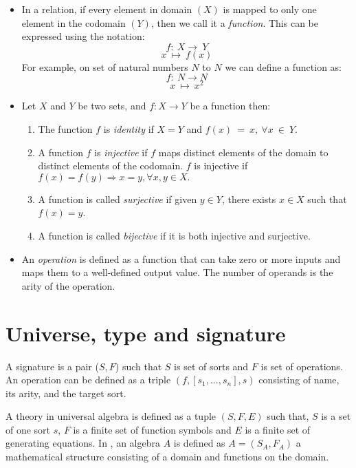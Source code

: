 \begin{itemize}
\item In a relation, if every element in domain $(X)$ is mapped to only one element in
the codomain $(Y)$, then we call it a \emph{function}. This can be expressed using the notation:
\[f:\ X \rightarrow\ Y\]
\[x \ \mapsto\ f(x)\]
For example, on set of natural numbers $N$ to $N$ we can define a function as:
\[f:\ N \rightarrow N\]
\[x \ \mapsto\ x^{2}\]   
\item Let $ X $ and $ Y $ be two sets, and $ f:X \rightarrow Y$ be a function then:
\begin{enumerate}
    \item The function $f$ is \textit{identity} if $X=Y$ and $f(x)\ =\ x,\
    \forall x\ \in \ Y$.
    \item A function $f$ is \emph{injective} if $f$ maps distinct elements of
    the domain to distinct elements of the codomain. $f$ is injective if
    $f(x)=f(y) \Rightarrow x = y, \forall x,y \in X.$
    \item A function is called \emph{surjective} if given $y \in Y$, there
    exists $x\in X$ such that $f(x) = y$.
    \item A function is called \emph{bijective} if it is both injective and
    surjective.
\end{enumerate}
\item An \emph{operation} is defined as a function that can take zero or more inputs
and maps them to a well-defined output value. The number of operands is the arity
of the operation.
\end{itemize}

\section{Universe, type and signature}
A signature is a pair ($S,F$) such that $S$ is set of sorts and $F$ is set of
operations. An operation can be defined as a triple $(f,[s_1,...,s_n],s)$
consisting of name, its arity, and the target sort. 

A theory in universal algebra is defined as a tuple $(S,F,E)$ such that, $S$ is
a set of one sort $s$, $F$ is a finite set of function symbols and $E$ is a
finite set of generating equations. In \cite{YSharoda}, an algebra $A$ is
defined as $A = (S_A,F_A)$ a mathematical structure consisting of a domain and
functions on the domain.


